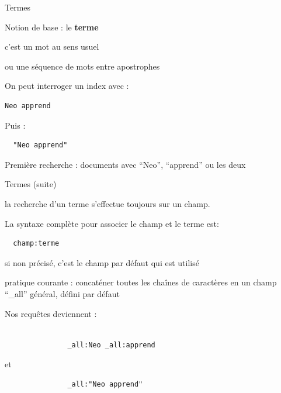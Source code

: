 \begin{frame}[fragile]{Termes}

  \begin{redbullet}
    \item Notion de base : le {\bf terme}
    \item c'est un mot au sens usuel
    \item ou une séquence de mots entre apostrophes
  \end{redbullet}
\smallskip
On peut interroger un index avec :
\begin{verbatim}
Neo apprend
\end{verbatim}
Puis :
\begin{verbatim}
  "Neo apprend"
\end{verbatim}
\vfill
\begin{blocgauche}
  Première recherche : documents avec ``Neo'', ``apprend'' ou les deux
\end{blocgauche}

\end{frame}

\begin{frame}[fragile]{Termes (suite)}
  \begin{redbullet}
    \item la recherche d'un terme s'effectue toujours sur un champ. 
\item La syntaxe complète pour associer le champ et le terme est:
\begin{verbatim}
  champ:terme
\end{verbatim}
\item si non précisé, c'est le champ par défaut qui est utilisé
\item pratique courante : concaténer toutes les chaînes de caractères en un
  champ ``\_all'' général, défini par défaut
\item Nos requêtes deviennent :
\begin{verbatim}

               _all:Neo _all:apprend
\end{verbatim}
\item et 
\begin{verbatim}
               _all:"Neo apprend"
\end{verbatim}
  \end{redbullet}
\end{frame}

